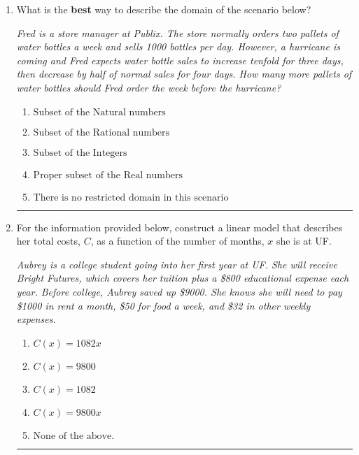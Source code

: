 \documentclass[14pt]{extbook}
\newcommand{\litem}[1]{\item#1\hspace*{-1cm}\rule{\textwidth}{0.4pt}}
\begin{document}
\begin{enumerate}
{\begin{enumerate}[label=\Alph*.]
\end{enumerate} }
\litem{
What is the \textbf{best} way to describe the domain of the scenario below?
\begin{center}
    \textit{ Fred is a store manager at Publix. The store normally orders two pallets of water bottles a week and sells 1000 bottles per day. However, a hurricane is coming and Fred expects water bottle sales to increase tenfold for three days, then decrease by half of normal sales for four days. How many more pallets of water bottles should Fred order the week before the hurricane? }
\end{center}
\begin{enumerate}[label=\Alph*.]
\item \( \text{Subset of the Natural numbers} \)
\item \( \text{Subset of the Rational numbers} \)
\item \( \text{Subset of the Integers} \)
\item \( \text{Proper subset of the Real numbers} \)
\item \( \text{There is no restricted domain in this scenario} \)

\end{enumerate} }
\litem{
For the information provided below, construct a linear model that describes her total costs, $C$, as a function of the number of months, $x$ she is at UF. 
\begin{center}
    \textit{ Aubrey is a college student going into her first year at UF. She will receive Bright Futures, which covers her tuition plus a \$800 educational expense each year. Before college, Aubrey saved up \$9000. She knows she will need to pay \$1000 in rent a month, \$50 for food a week, and \$32 in other weekly expenses. }
\end{center}
\begin{enumerate}[label=\Alph*.]
\item \( C(x) = 1082 x \)
\item \( C(x) = 9800 \)
\item \( C(x) = 1082 \)
\item \( C(x) = 9800 x \)
\item \( \text{None of the above.} \)


\end{enumerate}}
\end{enumerate}
\end{document}
